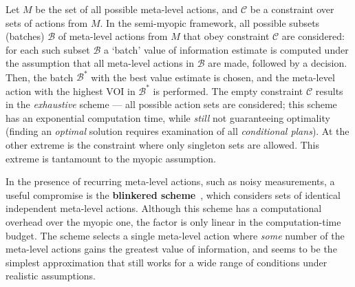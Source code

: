 Let $M$ be the set of all possible meta-level actions, and
${\mathcal C}$ be a constraint over sets of actions from $M$. In the
semi-myopic framework, all possible subsets (batches) ${\mathcal B}$
of meta-level actions from $M$ that obey constraint ${\mathcal C}$ are
considered: for each such subset ${\mathcal B}$ a `batch' value of
information estimate is computed under the assumption that all
meta-level actions in ${\mathcal B}$ are made, followed by a decision.
Then, the batch ${\mathcal B}^*$ with the best
value estimate is chosen, and the meta-level action with the highest
VOI in ${\mathcal B}^*$ is performed.  The empty constraint $\mathcal
C$ results in the {\em exhaustive} scheme --- all possible action sets
are considered; this scheme has an exponential computation time, while
{\em still} not guaranteeing optimality (finding an
\emph{optimal} solution requires examination of all \emph{conditional plans}).
At the other extreme is the constraint where only singleton sets are
allowed. This extreme is tantamount to the myopic assumption.

In the presence of recurring meta-level
actions, such as
noisy measurements, a useful compromise is the \textbf{blinkered
scheme}~\cite{TolpinShimony.blinkered}, which considers sets of
identical independent meta-level actions.  Although this scheme has a
computational overhead over the myopic one, the factor is only linear
in the computation-time budget.  The scheme selects a single meta-level action where
{\em some} number of the meta-level actions gains the greatest value
of information, and seems to be the simplest approximation that still
works for a wide range of conditions under realistic assumptions.
